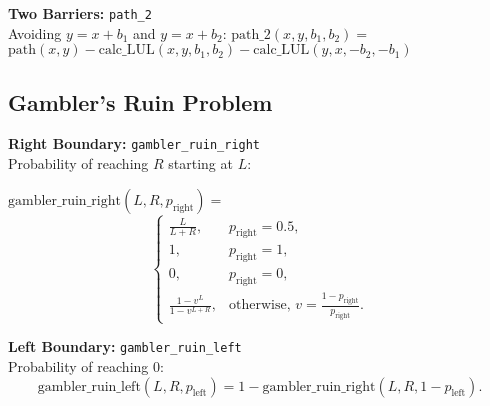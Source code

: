     \textbf{Two Barriers:} \texttt{path\_2} \\
    Avoiding $y=x+b_1$ and $y=x+b_2$:
    $\text{path\_2}(x, y, b_1, b_2) =$ \newline
	$\text{path}(x, y) - \text{calc\_LUL}(x, y, b_1, b_2) - \text{calc\_LUL}(y, x, -b_2, -b_1)$

    \subsection{Gambler's Ruin Problem}
    \textbf{Right Boundary:} \texttt{gambler\_ruin\_right} \\
    Probability of reaching $R$ starting at $L$:
    
    $\text{gambler\_ruin\_right}(L, R, p_{\text{right}}) = $ \newline
    \[
	\begin{cases}
    \frac{L}{L+R}, & p_{\text{right}} = 0.5, \\
    1, & p_{\text{right}} = 1, \\
    0, & p_{\text{right}} = 0, \\
    \frac{1 - v^L}{1 - v^{L+R}}, & \text{otherwise, } v = \frac{1-p_{\text{right}}}{p_{\text{right}}}.
    \end{cases}
    \]

    \textbf{Left Boundary:} \texttt{gambler\_ruin\_left} \\
    Probability of reaching $0$:
    \[
    \text{gambler\_ruin\_left}(L, R, p_{\text{left}}) = 1 - \text{gambler\_ruin\_right}(L, R, 1-p_{\text{left}}).
    \]